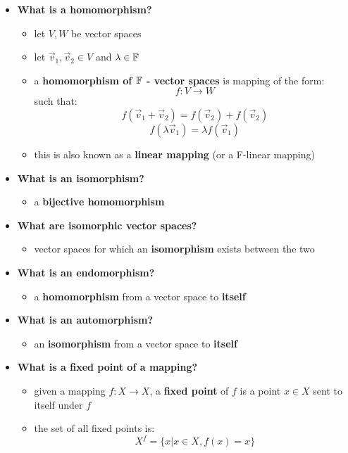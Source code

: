 \documentclass{exam}
\begin{document}
\begin{itemize}
    \item \textbf{What is a homomorphism?}
    \begin{itemize}
        \item let $V,W$ be vector spaces
        \item let $\vec{v}_1, \vec{v}_2 \in V$ and $\lambda \in \mathbb{F}$
        \item a \textbf{homomorphism of $\mathbb{F}$ - vector spaces} is  mapping of the form:
        \[
        f : V \to W
        \]
        such that:
        \[
        f(\vec{v}_1 + \vec{v}_2) = f(\vec{v}_2) + f(\vec{v}_2)
        \]
        \[
        f(\lambda \vec{v}_1) = \lambda f(\vec{v}_1)
        \]
        \item this is also known as a \textbf{linear mapping} (or a F-linear mapping)
    \end{itemize}
    \item \textbf{What is an isomorphism?}
    \begin{itemize}
        \item a \textbf{bijective homomorphism}
    \end{itemize}
    \item \textbf{What are isomorphic vector spaces?}
    \begin{itemize}
        \item vector spaces for which an \textbf{isomorphism} exists between the two
    \end{itemize}
    \item \textbf{What is an endomorphism?}
    \begin{itemize}
        \item a \textbf{homomorphism} from a vector space to \textbf{itself}
    \end{itemize}
    \item \textbf{What is an automorphism?}
    \begin{itemize}
        \item an \textbf{isomorphism} from a vector space to \textbf{itself}
    \end{itemize}
    \item \textbf{What is a fixed point of a mapping?}
    \begin{itemize}
        \item given a mapping $f : X \to X$, a \textbf{fixed point} of $f$ is a point $x \in X$ sent to itself under $f$
        \item the set of all fixed points is:
        \[
        X^f = \{x | x \in X, f(x) = x\}
        \]
    \end{itemize}
\end{itemize}
\end{document}
